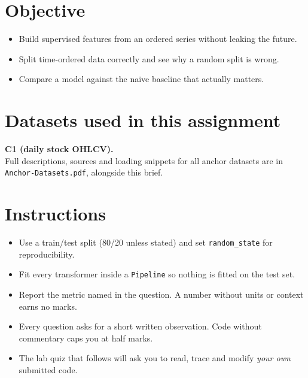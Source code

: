 \documentclass[11pt,a4paper]{article}
\begin{document}

\section*{Objective}

\begin{itemize}[leftmargin=*]

  \item Build supervised features from an ordered series without leaking the future.

  \item Split time-ordered data correctly and see why a random split is wrong.

  \item Compare a model against the naive baseline that actually matters.

\end{itemize}

\section*{Datasets used in this assignment}

\textbf{C1 (daily stock OHLCV).}\\ Full descriptions, sources and loading snippets for all anchor datasets are in \texttt{Anchor-Datasets.pdf}, alongside this brief.

\section*{Instructions}

\begin{itemize}[leftmargin=*]

  \item Use a train/test split (80/20 unless stated) and set \texttt{random\_state} for reproducibility.

  \item Fit every transformer inside a \texttt{Pipeline} so nothing is fitted on the test set.

  \item Report the metric named in the question. A number without units or context earns no marks.

  \item Every question asks for a short written observation. Code without commentary caps you at half marks.

  \item The lab quiz that follows will ask you to read, trace and modify \emph{your own} submitted code.

\end{itemize}
\end{document}
